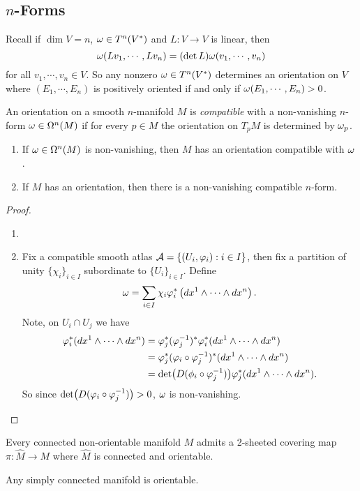 \subsection{$n$-Forms}
Recall if $\dim V = n$, $\omega \in T^n(V^*)$ and $L:V \to V$ is linear, then 
$$\omega(Lv_1,\cdots,Lv_n) = (\det L)\omega(v_1,\cdots,v_n)$$ for all $v_1,\cdots,v_n \in V$. So any nonzero $\omega \in T^n(V^*)$ determines an orientation on $V$ where $(E_1, \cdots, E_n)$ is positively oriented if and only if $\omega(E_1,\cdots,E_n)>0$.
\begin{definition}
    An orientation on a smooth $n$-manifold $M$ is \textit{compatible} with a non-vanishing $n$-form $\omega \in \Omega^n(M)$ if for every $p \in M$ the orientation on $T_pM$ is determined by $\omega_p$. 
\end{definition}
\begin{proposition}\label{15.5}
    \begin{enumerate}
    \item If $\omega \in \Omega^n(M)$ is non-vanishing, then $M$ has an orientation compatible with $\omega$. 
    \item If $M$ has an orientation, then there is a non-vanishing compatible $n$-form.
    \end{enumerate}
\end{proposition}
\begin{proof}
    \begin{enumerate}
    \item 
    \item Fix a compatible smooth atlas $\mathcal{A} = \{(U_i,\varphi_i): i \in I\}$, then fix a partition of unity $\{\chi_i\}_{i \in I}$ subordinate to $\{U_i\}_{i \in I}$. Define 
    $$ \omega = \sum_{i \in I}\chi_i \varphi_i^*\left(
       dx^1 \wedge \cdots \wedge dx^n \right). $$
    Note, on $U_i \cap U_j$ we have 
    \begin{align*}
    \varphi_i^*(dx^1 \wedge \cdots \wedge dx^n) 
    &= \varphi_j^*(\varphi_j^{-1})^*\varphi_i^*(dx^1 \wedge \cdots \wedge dx^n) \\
    &= \varphi_j^*(\varphi_i \circ \varphi_j^{-1})^*(dx^1 \wedge \cdots \wedge dx^n) \\
    &= \det (D(\phi_i \circ \varphi_j^{-1}) )
       \varphi_j^*(dx^1 \wedge \cdots \wedge dx^n).
    \end{align*}
    So since $\det(D(\varphi_i \circ \varphi_j^{-1})) > 0$, $\omega$ is non-vanishing. 
    \end{enumerate}
\end{proof}
\begin{theorem}\label{15.41}
    Every connected non-orientable manifold $M$ admits a 2-sheeted covering map $\pi:\hat{M} \to M$ where $\hat{M}$ is connected and orientable. 
\end{theorem}
\begin{corollary}
    Any simply connected manifold is orientable. 
\end{corollary}









